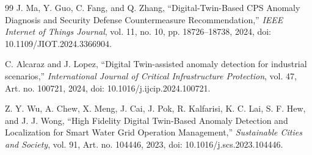 \documentclass[conference]{IEEEtran}
\begin{document}
\begin{thebibliography}{99}
J. Ma, Y. Guo, C. Fang, and Q. Zhang, ``Digital-Twin-Based CPS Anomaly Diagnosis and Security Defense Countermeasure Recommendation,'' \emph{IEEE Internet of Things Journal}, vol. 11, no. 10, pp. 18726--18738, 2024, doi: 10.1109/JIOT.2024.3366904.

C. Alcaraz and J. Lopez, ``Digital Twin-assisted anomaly detection for industrial scenarios,'' \emph{International Journal of Critical Infrastructure Protection}, vol. 47, Art. no. 100721, 2024, doi: 10.1016/j.ijcip.2024.100721.

Z. Y. Wu, A. Chew, X. Meng, J. Cai, J. Pok, R. Kalfarisi, K. C. Lai, S. F. Hew, and J. J. Wong, ``High Fidelity Digital Twin-Based Anomaly Detection and Localization for Smart Water Grid Operation Management,'' \emph{Sustainable Cities and Society}, vol. 91, Art. no. 104446, 2023, doi: 10.1016/j.scs.2023.104446.

\end{thebibliography}
\end{document}

